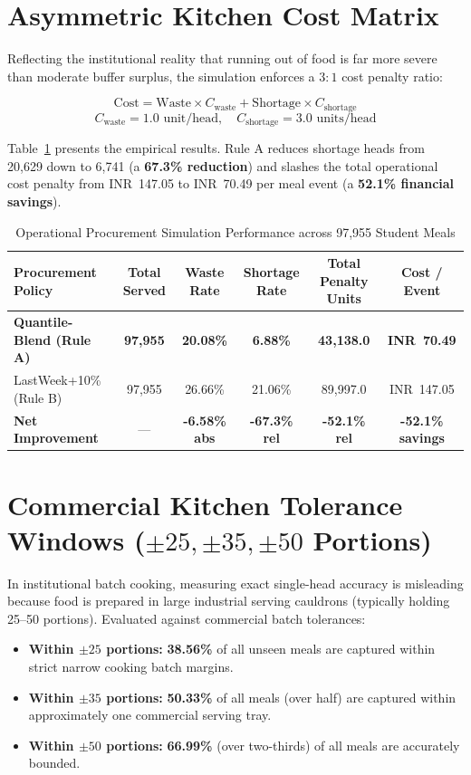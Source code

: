 \documentclass[11pt,a4paper,oneside]{report}
\newcommand{\inr}{\textsf{INR~}}
\begin{document}
\section{Asymmetric Kitchen Cost Matrix}
Reflecting the institutional reality that running out of food is far more severe than moderate buffer surplus, the simulation enforces a $3:1$ cost penalty ratio:
\begin{mathformulationbox}
$$\text{Cost} = \text{Waste} \times C_{\text{waste}} + \text{Shortage} \times C_{\text{shortage}}$$
$$C_{\text{waste}} = 1.0\text{ unit/head}, \quad C_{\text{shortage}} = 3.0\text{ units/head}$$
\end{mathformulationbox}
Table~\ref{tab:ops_summary} presents the empirical results. Rule A reduces shortage heads from 20,629 down to 6,741 (a \textbf{67.3\% reduction}) and slashes the total operational cost penalty from \inr 147.05 to \inr 70.49 per meal event (a \textbf{52.1\% financial savings}).

\begin{table}[ht]
\centering
\small
\renewcommand{\arraystretch}{1.3}
\begin{tabularx}{\textwidth}{lccccc}
\toprule
\rowcolor{bluelight}
\textbf{Procurement Policy} & \textbf{Total Served} & \textbf{Waste Rate} & \textbf{Shortage Rate} & \textbf{Total Penalty Units} & \textbf{Cost / Event} \\
\midrule
\textbf{Quantile-Blend (Rule A)} & \textbf{97,955} & \textbf{20.08\%} & \textbf{6.88\%} & \textbf{43,138.0} & \textbf{\inr 70.49} \\
LastWeek+10\% (Rule B) & 97,955 & 26.66\% & 21.06\% & 89,997.0 & \inr 147.05 \\
\midrule
\textbf{Net Improvement} & --- & \textbf{-6.58\% abs} & \textbf{-67.3\% rel} & \textbf{-52.1\% rel} & \textbf{-52.1\% savings} \\
\bottomrule
\end{tabularx}
\caption{Operational Procurement Simulation Performance across 97,955 Student Meals}
\label{tab:ops_summary}
\end{table}

\section{Commercial Kitchen Tolerance Windows (\texorpdfstring{$\pm 25, \pm 35, \pm 50$}{+/- 25, +/- 35, +/- 50} Portions)}
In institutional batch cooking, measuring exact single-head accuracy is misleading because food is prepared in large industrial serving cauldrons (typically holding 25--50 portions). Evaluated against commercial batch tolerances:
\begin{itemize}
  \item \textbf{Within $\pm 25$ portions:} \textbf{38.56\%} of all unseen meals are captured within strict narrow cooking batch margins.
  \item \textbf{Within $\pm 35$ portions:} \textbf{50.33\%} of all meals (over half) are captured within approximately one commercial serving tray.
  \item \textbf{Within $\pm 50$ portions:} \textbf{66.99\%} (over two-thirds) of all meals are accurately bounded.
\end{itemize}
\end{document}

